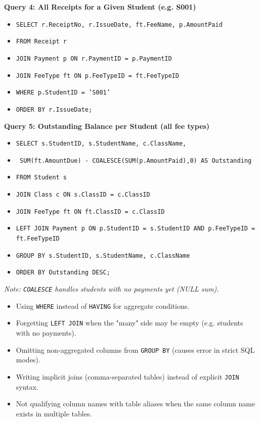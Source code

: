 \documentclass[11pt]{article}
\begin{document}
\begin{exoresolu}
\textbf{Query 4: All Receipts for a Given Student (e.g. S001)}\par
\begin{methode}[SQL]
\begin{itemize}
    \item \texttt{SELECT r.ReceiptNo, r.IssueDate, ft.FeeName, p.AmountPaid}
    \item \texttt{FROM Receipt r}
    \item \texttt{JOIN Payment p ON r.PaymentID = p.PaymentID}
    \item \texttt{JOIN FeeType ft ON p.FeeTypeID = ft.FeeTypeID}
    \item \texttt{WHERE p.StudentID = 'S001'}
    \item \texttt{ORDER BY r.IssueDate;}
\end{itemize}
\end{methode}

\textbf{Query 5: Outstanding Balance per Student (all fee types)}\par
\begin{methode}[SQL]
\begin{itemize}
    \item \texttt{SELECT s.StudentID, s.StudentName, c.ClassName,}
    \item \texttt{       SUM(ft.AmountDue) - COALESCE(SUM(p.AmountPaid),0) AS Outstanding}
    \item \texttt{FROM Student s}
    \item \texttt{JOIN Class c ON s.ClassID = c.ClassID}
    \item \texttt{JOIN FeeType ft ON ft.ClassID = c.ClassID}
    \item \texttt{LEFT JOIN Payment p ON p.StudentID = s.StudentID AND p.FeeTypeID = ft.FeeTypeID}
    \item \texttt{GROUP BY s.StudentID, s.StudentName, c.ClassName}
    \item \texttt{ORDER BY Outstanding DESC;}
\end{itemize}
\end{methode}
\textit{Note: \texttt{COALESCE} handles students with no payments yet (NULL sum).}
\end{exoresolu}

\begin{attention}
\begin{itemize}
    \item Using \texttt{WHERE} instead of \texttt{HAVING} for aggregate conditions.
    \item Forgetting \texttt{LEFT JOIN} when the "many" side may be empty (e.g. students with no payments).
    \item Omitting non-aggregated columns from \texttt{GROUP BY} (causes error in strict SQL modes).
    \item Writing implicit joins (comma-separated tables) instead of explicit \texttt{JOIN} syntax.
    \item Not qualifying column names with table aliases when the same column name exists in multiple tables.
\end{itemize}
\end{attention}
\end{document}
